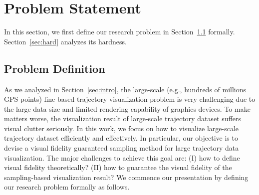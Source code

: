 \section{Problem Statement}\label{sec:pro}
In this section, we first define our research problem in Section~\ref{sec:def} formally.
Section~\ref{sec:hard} analyzes its hardness.
%


\subsection{Problem Definition}\label{sec:def}
As we analyzed in Section~\ref{sec:intro}, the large-scale (e.g., hundreds of millions GPS points) line-based trajectory visualization problem is very challenging due to the large data size and limited rendering capability of graphics devices.
To make matters worse, the visualization result of large-scale trajectory dataset suffers visual clutter seriously.
In this work, we focus on how to visualize large-scale trajectory dataset efficiently and effectively.
In particular, our objective is to devise a visual fidelity guaranteed sampling method for large trajectory data visualization.
The major challenges to achieve this goal are:
(I) how to define visual fidelity theoretically? (II) how to guarantee the visual fidelity of the sampling-based visualization result?
We commence our presentation by defining our research problem formally as follows.

